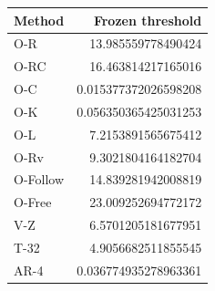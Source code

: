 \begin{tabular}{lr}
\toprule
Method & Frozen threshold \\
\midrule
O-R & 13.985559778490424 \\
O-RC & 16.463814217165016 \\
O-C & 0.015377372026598208 \\
O-K & 0.056350365425031253 \\
O-L & 7.2153891565675412 \\
O-Rv & 9.3021804164182704 \\
O-Follow & 14.839281942008819 \\
O-Free & 23.009252694772172 \\
V-Z & 6.5701205181677951 \\
T-32 & 4.9056682511855545 \\
AR-4 & 0.036774935278963361 \\
\bottomrule
\end{tabular}
